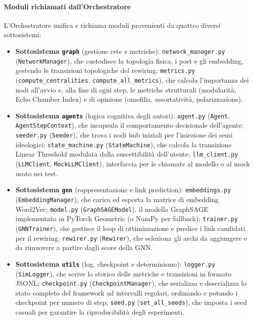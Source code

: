 \documentclass[11pt, a4paper]{article}
\begin{document}
\paragraph{Moduli richiamati dall'Orchestratore}
L'Orchestratore unifica e richiama moduli provenienti da quattro diversi sottosistemi:
\begin{itemize}[leftmargin=*]
    \item \textbf{Sottosistema \texttt{graph}} (gestione rete e metriche): \texttt{network\_manager.py} (\texttt{NetworkManager}), che custodisce la topologia fisica, i post e gli embedding, gestendo le transizioni topologiche del rewiring; \texttt{metrics.py} (\texttt{compute\_centralities}, \texttt{compute\_all\_metrics}), che calcola l'importanza dei nodi all'avvio e, alla fine di ogni step, le metriche strutturali (modularità, Echo Chamber Index) e di opinione (omofilia, assortatività, polarizzazione).
    \item \textbf{Sottosistema \texttt{agents}} (logica cognitiva degli autori): \texttt{agent.py} (\texttt{Agent}, \texttt{AgentStepContext}), che incapsula il comportamento decisionale dell'agente; \texttt{seeder.py} (\texttt{Seeder}), che trova i nodi hub iniziali per l'iniezione dei semi ideologici; \texttt{state\_machine.py} (\texttt{StateMachine}), che calcola la transizione Linear Threshold modulata dalla suscettibilità dell'utente; \texttt{llm\_client.py} (\texttt{LLMClient}, \texttt{MockLLMClient}), interfaccia per le chiamate al modello o al mock usato nei test.
    \item \textbf{Sottosistema \texttt{gnn}} (rappresentazione e link prediction): \texttt{embeddings.py} (\texttt{EmbeddingManager}), che carica ed esporta la matrice di embedding Word2Vec; \texttt{model.py} (\texttt{GraphSAGEModel}), il modello GraphSAGE implementato in PyTorch Geometric (o NumPy per fallback); \texttt{trainer.py} (\texttt{GNNTrainer}), che gestisce il loop di ottimizzazione e predice i link candidati per il rewiring; \texttt{rewirer.py} (\texttt{Rewirer}), che seleziona gli archi da aggiungere e da rimuovere a partire dagli score della GNN.
    \item \textbf{Sottosistema \texttt{utils}} (log, checkpoint e determinismo): \texttt{logger.py} (\texttt{SimLogger}), che scrive lo storico delle metriche e transizioni in formato JSONL; \texttt{checkpoint.py} (\texttt{CheckpointManager}), che serializza e deserializza lo stato completo del framework ad intervalli regolari, ordinando e potando i checkpoint per numero di step; \texttt{seed.py} (\texttt{set\_all\_seeds}), che imposta i seed casuali per garantire la riproducibilità degli esperimenti.
\end{itemize}
\end{document}
